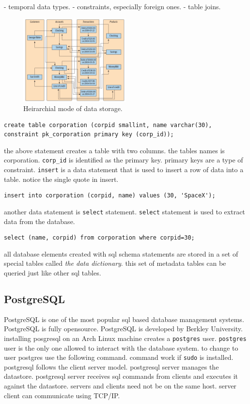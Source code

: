 \documentclass[a4paper]{article}
\begin{document}
- temporal data types.
- constraints, especially foreign ones.
- table joins.

\begin{figure}[hbt!]
    \centering
    \includegraphics[width=0.5\textwidth]{graphics/network-database.png}
    \caption{Heirarchial mode of data storage.}
\end{figure}

\begin{lstlisting}
create table corporation (corpid smallint, name varchar(30), constraint pk_corporation primary key (corp_id));
\end{lstlisting}

the above statement creates a table with two columns. the tables names is corporation. \lstinline{corp_id} is identified as the 
primary key. primary keys are a type of constraint. \lstinline{insert} is a data statement that is used to insert a row of data into
a table. notice the single quote in insert.

\begin{lstlisting}
insert into corporation (corpid, name) values (30, 'SpaceX');
\end{lstlisting}

another data statement is \lstinline{select} statement. \lstinline{select} statement is used to extract data from the database.

\begin{lstlisting}
select (name, corpid) from corporation where corpid=30;
\end{lstlisting}

all database elements created with sql schema statements are stored in a set of special tables called \emph{the data dictionary}.
this set of metadata tables can be queried just like other sql tables.

\subsection*{PostgreSQL}
\lstset{style=custom-bash}
PostgreSQL is one of the most popular sql based database management systems. PostgreSQL is fully opensource. PostgreSQL is developed 
by Berkley University. installing posgresql on  an Arch Linux machine creates a \lstinline{postgres} user. \lstinline{postgres} user 
is the only one allowed to interact with the database system. to change to user postgres use the following command. command work 
if \lstinline{sudo} is installed. postgresql follows the client server model. postgresql server manages the datastore. postgresql 
server receives sql commands from clients and executes it against the datastore. servers and clients need not be on the same host.
server client can communicate using TCP/IP.
\end{document}

